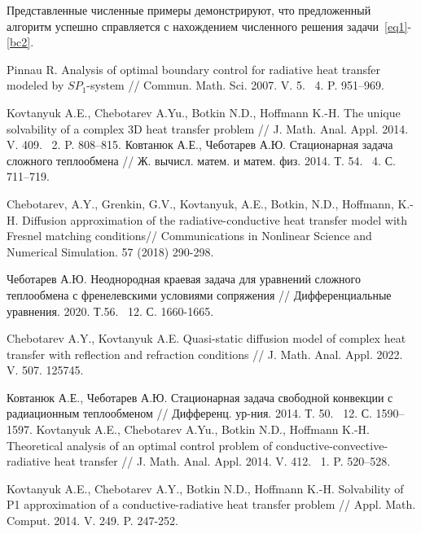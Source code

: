 \documentclass[12pt]{article}
\begin{document}
    Представленные численные примеры демонстрируют,
    что предложенный алгоритм успешно справляется
    с нахождением численного решения задачи~\eqref{eq1}-\eqref{bc2}.

    \begin{thebibliography}{999}

        Pinnau R. Analysis of optimal boundary control for radiative heat transfer modeled by $SP_1$-system //
        Commun. Math. Sci. 2007. V. 5. \textnumero~4. P. 951--969.

        Kovtanyuk A.E., Chebotarev A.Yu., Botkin N.D., Hoffmann K.-H. The unique solvability of a complex 3D heat transfer problem // J. Math. Anal. Appl. 2014. V. 409. \textnumero~2. P. 808--815.
        Ковтанюк А.Е., Чеботарев А.Ю. Стационарная задача сложного теплообмена // Ж. вычисл. матем. и матем. физ. 2014. Т. 54. \textnumero~4. С. 711--719.

        Chebotarev, A.Y., Grenkin, G.V., Kovtanyuk, A.E., Botkin, N.D., Hoffmann, K.-H. Diffusion approximation of the radiative-conductive heat transfer model with Fresnel matching conditions// Communications in Nonlinear Science and Numerical Simulation. 57 (2018) 290-298.

        Чеботарев А.Ю. Неоднородная краевая задача для уравнений сложного теплообмена с френелевскими условиями сопряжения // Дифференциальные уравнения. 2020. Т.56. \textnumero~12. С. 1660-1665.

        Chebotarev A.Y., Kovtanyuk A.E. Quasi-static diffusion model of complex heat transfer with reflection and refraction conditions // J. Math. Anal. Appl. 2022. V. 507. 125745.

        Ковтанюк А.Е., Чеботарев А.Ю. Стационарная задача свободной конвекции с радиационным теплообменом // Дифференц. ур-ния. 2014. Т. 50. \textnumero~12. С. 1590--1597.
        Kovtanyuk A.E., Chebotarev A.Yu., Botkin N.D., Hoffmann K.-H. Theoretical analysis of an optimal control problem of conductive-convective-radiative heat transfer // J. Math. Anal.
        Appl. 2014. V. 412. \textnumero~1. P. 520--528.

        Kovtanyuk A.E., Chebotarev A.Y.,  Botkin N.D., Hoffmann K.-H.
        Solvability of P1 approximation of a conductive-radiative heat transfer problem //
        Appl. Math. Comput. 2014. V. 249. P. 247-252.


\end{thebibliography}
\end{document}
